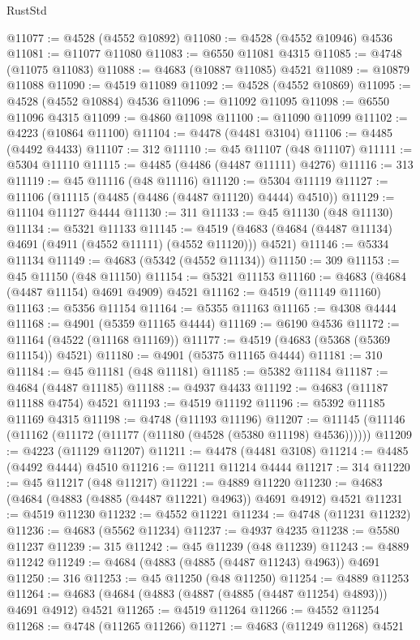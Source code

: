\begin{lexlean}{RustStd}
\begin{coremodule}
@11077 := @4528 (@4552 @10892)
@11080 := @4528 (@4552 @10946) @4536
@11081 := @11077 @11080
@11083 := @6550 @11081 @4315
@11085 := @4748 (@11075 @11083)
@11088 := @4683 (@10887 @11085) @4521
@11089 := @10879 @11088
@11090 := @4519 @11089
@11092 := @4528 (@4552 @10869)
@11095 := @4528 (@4552 @10884) @4536
@11096 := @11092 @11095
@11098 := @6550 @11096 @4315
@11099 := @4860 @11098
@11100 := @11090 @11099
@11102 := @4223 (@10864 @11100)
@11104 := @4478 (@4481 @3104)
@11106 := @4485 (@4492 @4433)
@11107 := 312
@11110 := @45 @11107 (@48 @11107)
@11111 := @5304 @11110
@11115 := @4485 (@4486 (@4487 @11111) @4276)
@11116 := 313
@11119 := @45 @11116 (@48 @11116)
@11120 := @5304 @11119
@11127 := @11106 (@11115 (@4485 (@4486 (@4487 @11120) @4444) @4510))
@11129 := @11104 @11127 @4444
@11130 := 311
@11133 := @45 @11130 (@48 @11130)
@11134 := @5321 @11133
@11145 := @4519 (@4683 (@4684 (@4487 @11134) @4691 (@4911 (@4552 @11111) (@4552 @11120))) @4521)
@11146 := @5334 @11134
@11149 := @4683 (@5342 (@4552 @11134))
@11150 := 309
@11153 := @45 @11150 (@48 @11150)
@11154 := @5321 @11153
@11160 := @4683 (@4684 (@4487 @11154) @4691 @4909) @4521
@11162 := @4519 (@11149 @11160)
@11163 := @5356 @11154
@11164 := @5355 @11163
@11165 := @4308 @4444
@11168 := @4901 (@5359 @11165 @4444)
@11169 := @6190 @4536
@11172 := @11164 (@4522 (@11168 @11169))
@11177 := @4519 (@4683 (@5368 (@5369 @11154)) @4521)
@11180 := @4901 (@5375 @11165 @4444)
@11181 := 310
@11184 := @45 @11181 (@48 @11181)
@11185 := @5382 @11184
@11187 := @4684 (@4487 @11185)
@11188 := @4937 @4433
@11192 := @4683 (@11187 @11188 @4754) @4521
@11193 := @4519 @11192
@11196 := @5392 @11185 @11169 @4315
@11198 := @4748 (@11193 @11196)
@11207 := @11145 (@11146 (@11162 (@11172 (@11177 (@11180 (@4528 (@5380 @11198) @4536))))))
@11209 := @4223 (@11129 @11207)
@11211 := @4478 (@4481 @3108)
@11214 := @4485 (@4492 @4444) @4510
@11216 := @11211 @11214 @4444
@11217 := 314
@11220 := @45 @11217 (@48 @11217)
@11221 := @4889 @11220
@11230 := @4683 (@4684 (@4883 (@4885 (@4487 @11221) @4963)) @4691 @4912) @4521
@11231 := @4519 @11230
@11232 := @4552 @11221
@11234 := @4748 (@11231 @11232)
@11236 := @4683 (@5562 @11234)
@11237 := @4937 @4235
@11238 := @5580 @11237
@11239 := 315
@11242 := @45 @11239 (@48 @11239)
@11243 := @4889 @11242
@11249 := @4684 (@4883 (@4885 (@4487 @11243) @4963)) @4691
@11250 := 316
@11253 := @45 @11250 (@48 @11250)
@11254 := @4889 @11253
@11264 := @4683 (@4684 (@4883 (@4887 (@4885 (@4487 @11254) @4893))) @4691 @4912) @4521
@11265 := @4519 @11264
@11266 := @4552 @11254
@11268 := @4748 (@11265 @11266)
@11271 := @4683 (@11249 @11268) @4521

\end{coremodule}
\end{lexlean}
